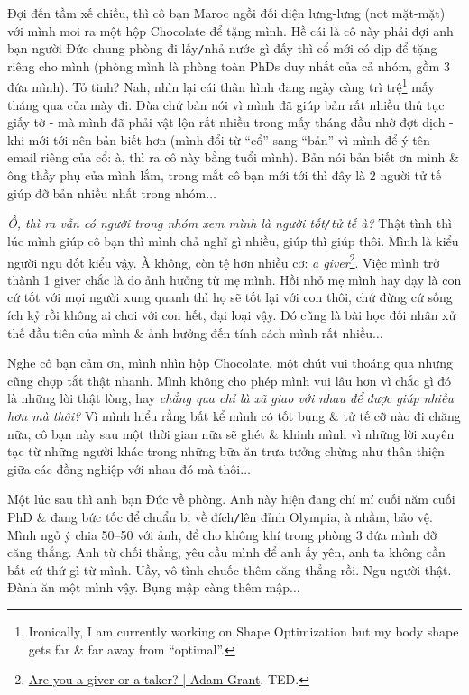 \documentclass[12pt]{article}
\begin{document}
Đợi đến tầm xế chiều, thì cô bạn Maroc ngồi đối diện lưng-lưng (not mặt-mặt) với mình moi ra một hộp Chocolate để tặng mình. Hề cái là cô này phải đợi anh bạn người Đức chung phòng đi lấy{\tt/}nhả nước gì đấy thì cổ mới có dịp để tặng riêng cho mình (phòng mình là phòng toàn PhDs duy nhất của cả nhóm, gồm 3 đứa mình). Tỏ tình? Nah, nhìn lại cái thân hình đang ngày càng trì trệ\footnote{Ironically, I am currently working on Shape Optimization but my body shape gets far \& far away from ``optimal''.} mấy tháng qua của mày đi. Đùa chứ bản nói vì mình đã giúp bản rất nhiều thủ tục giấy tờ - mà mình đã phải vật lộn rất nhiều trong mấy tháng đầu nhờ đợt dịch - khi mới tới nên bản biết hơn (mình đổi từ ``cổ'' sang ``bản'' vì mình để ý tên email riêng của cổ: à, thì ra cô này bằng tuổi mình). Bản nói bản biết ơn mình \& ông thầy phụ của mình lắm, trong mắt cô bạn mới tới thì đây là 2 người tử tế giúp đỡ bản nhiều nhất trong nhóm$\ldots$

{\it Ồ, thì ra vẫn có người trong nhóm xem mình là người tốt{\tt/}tử tế à?} Thật tình thì lúc mình giúp cô bạn thì mình chả nghĩ gì nhiều, giúp thì giúp thôi. Mình là kiểu người ngu dốt kiểu vậy. À không, còn tệ hơn nhiều cơ: {\it a giver}\footnote{\href{https://www.youtube.com/watch?v=YyXRYgjQXX0}{Are you a giver or a taker? | Adam Grant}, TED.}. Việc mình trở thành 1 giver chắc là do ảnh hưởng từ mẹ mình. Hồi nhỏ mẹ mình hay dạy là con cứ tốt với mọi người xung quanh thì họ sẽ tốt lại với con thôi, chứ đừng cứ sống ích kỷ rồi không ai chơi với con hết, đại loại vậy. Đó cũng là bài học đối nhân xử thế đầu tiên của mình \& ảnh hưởng đến tính cách mình rất nhiều$\ldots$

Nghe cô bạn cảm ơn, mình nhìn hộp Chocolate, một chút vui thoáng qua nhưng cũng chợp tắt thật nhanh. Mình không cho phép mình vui lâu hơn vì chắc gì đó là những lời thật lòng, hay {\it chẳng qua chỉ là xã giao với nhau để được giúp nhiều hơn mà thôi?} Vì mình hiểu rằng bất kể mình có tốt bụng \& tử tế cỡ nào đi chăng nữa, cô bạn này sau một thời gian nữa sẽ ghét \& khinh mình vì những lời xuyên tạc từ những người khác trong những bữa ăn trưa tưởng chừng như thân thiện giữa các đồng nghiệp với nhau đó mà thôi$\ldots$

Một lúc sau thì anh bạn Đức về phòng. Anh này hiện đang chí mí cuối năm cuối PhD \& đang bức tốc để chuẩn bị về đích{\tt/}lên đỉnh Olympia, à nhầm, bảo vệ. Mình ngỏ ý chia 50--50 với ảnh, để cho không khí trong phòng 3 đứa mình đỡ căng thẳng. Anh từ chối thẳng, yêu cầu mình để anh ấy yên, anh ta không cần bất cứ thứ gì từ mình. Uầy, vô tình chuốc thêm căng thẳng rồi. Ngu người thật. Đành ăn một mình vậy. Bụng mập càng thêm mập$\ldots$
\end{document}
